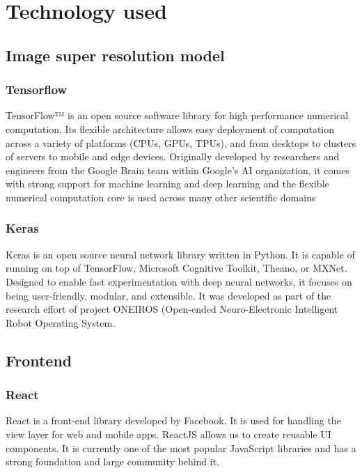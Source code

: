 \chapter{Technology used}

\section{Image super resolution model}

\subsection{Tensorflow}
TensorFlow™ is an open source software library for high performance numerical computation. Its flexible architecture allows easy deployment of computation across a variety of platforms (CPUs, GPUs, TPUs), and from desktops to clusters of servers to mobile and edge devices. Originally developed by researchers and engineers from the Google Brain team within Google’s AI organization, it comes with strong support for machine learning and deep learning and the flexible numerical computation core is used across many other scientific domains

\subsection{Keras}
Keras is an open source neural network library written in Python. It is capable of running on top of TensorFlow, Microsoft Cognitive Toolkit, Theano, or MXNet. Designed to enable fast experimentation with deep neural networks, it focuses on being user-friendly, modular, and extensible. It was developed as part of the research effort of project ONEIROS (Open-ended Neuro-Electronic Intelligent Robot Operating System.

\section{Frontend}

\subsection{React}
React is a front-end library developed by Facebook. It is used for handling the view layer for web and mobile apps. ReactJS allows us to create reusable UI components. It is currently one of the most popular JavaScript libraries and has a strong foundation and large community behind it.

